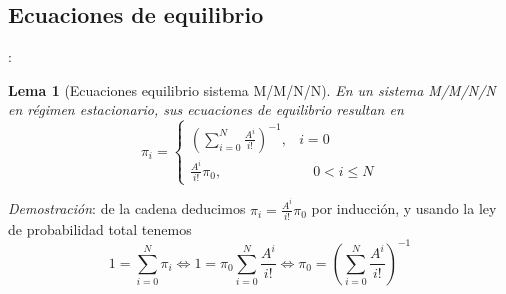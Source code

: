 \documentclass[xcolor={x11names}]{beamer}
\newtheorem{lema}{Lema}[section]
\begin{document}
\subsection{Ecuaciones de equilibrio}
\begin{frame}{\secname: \subsecname}
    \begin{lema}[Ecuaciones equilibrio
        sistema M/M/N/N]
        En un sistema M/M/N/N en régimen
        estacionario, sus ecuaciones de
        equilibrio resultan en
        \begin{equation}
            \pi_i=\begin{cases}
                \left(
                    \sum_{i=0}^N \frac{A^i}{i!}
                \right)^{-1}, & i=0\\
                \frac{A^i}{i!}\pi_0, &
                \quad 0<i\leq N
            \end{cases}
        \end{equation}
    \end{lema}

    \vfill
    \textit{Demostración}: de la
    cadena deducimos
    $\pi_i=\tfrac{A^i}{i!}\pi_0$ por
    inducción, y usando la ley de probabilidad
    total tenemos
    \begin{equation*}
        1 = \sum_{i=0}^N \pi_i
        \Longleftrightarrow
        1 = \pi_0\sum_{i=0}^N \frac{A^i}{i!}
        \Longleftrightarrow
        \pi_0=\left(
            \sum_{i=0}^N \frac{A^i}{i!}
        \right)^{-1}
    \end{equation*}
\end{frame}
\end{document}
